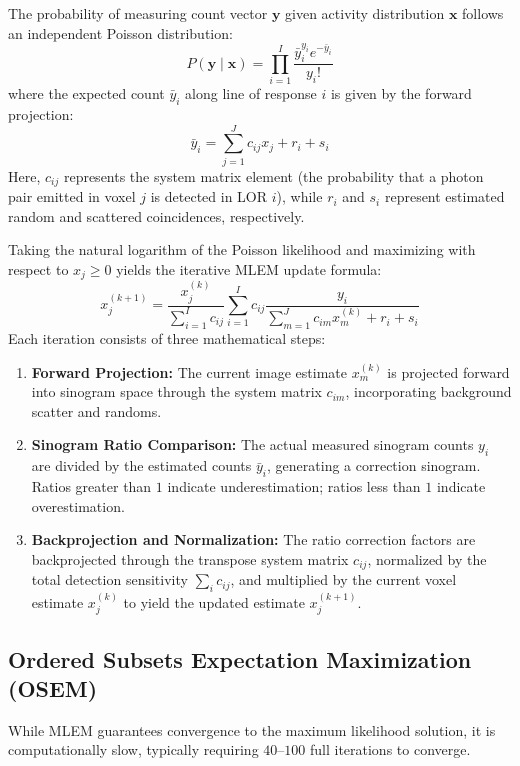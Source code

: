 \documentclass[11pt,a4paper]{article}
\begin{document}
The probability of measuring count vector $\mathbf{y}$ given activity distribution $\mathbf{x}$ follows an independent Poisson distribution:
\begin{equation}
    P(\mathbf{y} \mid \mathbf{x}) = \prod_{i=1}^I \frac{\bar{y}_i^{y_i} e^{-\bar{y}_i}}{y_i!}
\end{equation}
where the expected count $\bar{y}_i$ along line of response $i$ is given by the forward projection:
\begin{equation}
    \bar{y}_i = \sum_{j=1}^J c_{ij} x_j + r_i + s_i
\end{equation}
Here, $c_{ij}$ represents the system matrix element (the probability that a photon pair emitted in voxel $j$ is detected in LOR $i$), while $r_i$ and $s_i$ represent estimated random and scattered coincidences, respectively.

Taking the natural logarithm of the Poisson likelihood and maximizing with respect to $x_j \ge 0$ yields the iterative MLEM update formula:
\begin{equation}
    x_j^{(k+1)} = \frac{x_j^{(k)}}{\sum_{i=1}^I c_{ij}} \sum_{i=1}^I c_{ij} \frac{y_i}{\sum_{m=1}^J c_{im} x_m^{(k)} + r_i + s_i}
\end{equation}
Each iteration consists of three mathematical steps:
\begin{enumerate}
    \item \textbf{Forward Projection:} The current image estimate $x_m^{(k)}$ is projected forward into sinogram space through the system matrix $c_{im}$, incorporating background scatter and randoms.
    \item \textbf{Sinogram Ratio Comparison:} The actual measured sinogram counts $y_i$ are divided by the estimated counts $\bar{y}_i$, generating a correction sinogram. Ratios greater than $1$ indicate underestimation; ratios less than $1$ indicate overestimation.
    \item \textbf{Backprojection and Normalization:} The ratio correction factors are backprojected through the transpose system matrix $c_{ij}$, normalized by the total detection sensitivity $\sum_i c_{ij}$, and multiplied by the current voxel estimate $x_j^{(k)}$ to yield the updated estimate $x_j^{(k+1)}$.
\end{enumerate}

\subsection{Ordered Subsets Expectation Maximization (OSEM)}
While MLEM guarantees convergence to the maximum likelihood solution, it is computationally slow, typically requiring $40\text{--}100$ full iterations to converge. 
\end{document}
